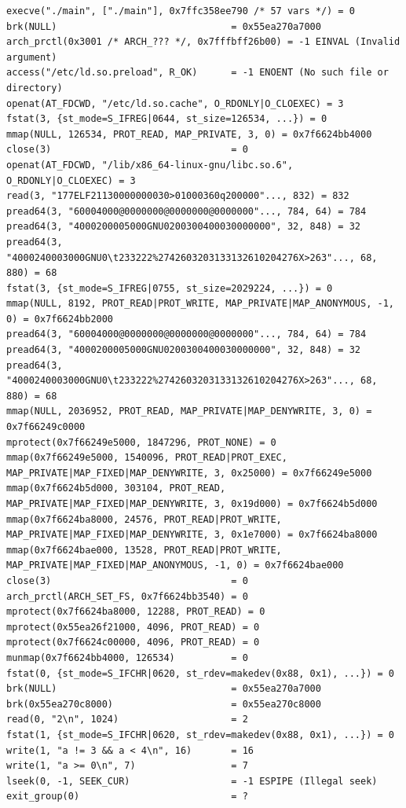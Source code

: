 \pagebreak
\begin{lstlisting}[caption={Trag sustavskih poziva programa \ref{cod:simbolicki_program} dobiven programom \inlinecode|strace|, uz unos znaka "4" na standardni ulaz},label={cod:syscall_trace}]
execve("./main", ["./main"], 0x7ffc358ee790 /* 57 vars */) = 0
brk(NULL)                               = 0x55ea270a7000
arch_prctl(0x3001 /* ARCH_??? */, 0x7fffbff26b00) = -1 EINVAL (Invalid argument)
access("/etc/ld.so.preload", R_OK)      = -1 ENOENT (No such file or directory)
openat(AT_FDCWD, "/etc/ld.so.cache", O_RDONLY|O_CLOEXEC) = 3
fstat(3, {st_mode=S_IFREG|0644, st_size=126534, ...}) = 0
mmap(NULL, 126534, PROT_READ, MAP_PRIVATE, 3, 0) = 0x7f6624bb4000
close(3)                                = 0
openat(AT_FDCWD, "/lib/x86_64-linux-gnu/libc.so.6", O_RDONLY|O_CLOEXEC) = 3
read(3, "177ELF21130000000030>01000360q200000"..., 832) = 832
pread64(3, "60004000@0000000@0000000@0000000"..., 784, 64) = 784
pread64(3, "4000200005000GNU0200300400030000000", 32, 848) = 32
pread64(3, "4000240003000GNU0\t233222%2742603203133132610204276X>263"..., 68, 880) = 68
fstat(3, {st_mode=S_IFREG|0755, st_size=2029224, ...}) = 0
mmap(NULL, 8192, PROT_READ|PROT_WRITE, MAP_PRIVATE|MAP_ANONYMOUS, -1, 0) = 0x7f6624bb2000
pread64(3, "60004000@0000000@0000000@0000000"..., 784, 64) = 784
pread64(3, "4000200005000GNU0200300400030000000", 32, 848) = 32
pread64(3, "4000240003000GNU0\t233222%2742603203133132610204276X>263"..., 68, 880) = 68
mmap(NULL, 2036952, PROT_READ, MAP_PRIVATE|MAP_DENYWRITE, 3, 0) = 0x7f66249c0000
mprotect(0x7f66249e5000, 1847296, PROT_NONE) = 0
mmap(0x7f66249e5000, 1540096, PROT_READ|PROT_EXEC, MAP_PRIVATE|MAP_FIXED|MAP_DENYWRITE, 3, 0x25000) = 0x7f66249e5000
mmap(0x7f6624b5d000, 303104, PROT_READ, MAP_PRIVATE|MAP_FIXED|MAP_DENYWRITE, 3, 0x19d000) = 0x7f6624b5d000
mmap(0x7f6624ba8000, 24576, PROT_READ|PROT_WRITE, MAP_PRIVATE|MAP_FIXED|MAP_DENYWRITE, 3, 0x1e7000) = 0x7f6624ba8000
mmap(0x7f6624bae000, 13528, PROT_READ|PROT_WRITE, MAP_PRIVATE|MAP_FIXED|MAP_ANONYMOUS, -1, 0) = 0x7f6624bae000
close(3)                                = 0
arch_prctl(ARCH_SET_FS, 0x7f6624bb3540) = 0
mprotect(0x7f6624ba8000, 12288, PROT_READ) = 0
mprotect(0x55ea26f21000, 4096, PROT_READ) = 0
mprotect(0x7f6624c00000, 4096, PROT_READ) = 0
munmap(0x7f6624bb4000, 126534)          = 0
fstat(0, {st_mode=S_IFCHR|0620, st_rdev=makedev(0x88, 0x1), ...}) = 0
brk(NULL)                               = 0x55ea270a7000
brk(0x55ea270c8000)                     = 0x55ea270c8000
read(0, "2\n", 1024)                    = 2
fstat(1, {st_mode=S_IFCHR|0620, st_rdev=makedev(0x88, 0x1), ...}) = 0
write(1, "a != 3 && a < 4\n", 16)       = 16
write(1, "a >= 0\n", 7)                 = 7
lseek(0, -1, SEEK_CUR)                  = -1 ESPIPE (Illegal seek)
exit_group(0)                           = ?
\end{lstlisting}

